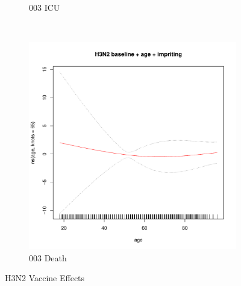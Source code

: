 \documentclass[12pt,twoside]{article}
\begin{document}
\begin{figure}[h]
{\begin{subfigure}{.49\linewidth}
                \caption{003 ICU}
        \end{subfigure}\\
        \begin{subfigure}{.49\linewidth}
                \includegraphics[width=\textwidth, page=3]{003Death_H3N2}
                \caption{003 Death}
        \end{subfigure}

        }
        \caption{H3N2 Vaccine Effects}\label{reduced}
    \end{figure}
    
    
    
\end{document}
